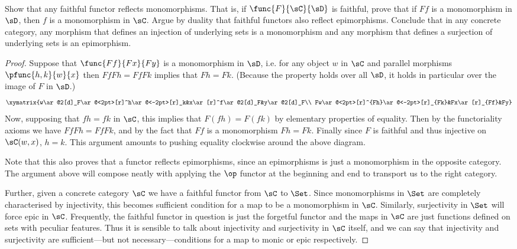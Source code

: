 \documentclass[main.tex]{subfiles}
\begin{document}
\paragraph{}
\begin{exercise}
	Show that any faithful functor reflects monomorphisms. That is, if
	\(\func{F}{\sC}{\sD}\) is faithful, prove that if \(Ff\) is a monomorphism
	in \(\sD\), then \(f\) is a monomorphism in \(\sC\). Argue by duality that
	faithful functors also reflect epimorphisms. Conclude that in any concrete
	category, any morphism that defines an injection of underlying sets is a
	monomorphism and any morphism that defines a surjection of underlying sets
	is an epimorphism.
\end{exercise}
\begin{proof}
	Suppose that \(\func{Ff}{Fx}{Fy}\) is a monomorphism in \(\sD\), i.e. for
	any object \(w\) in \(\sC\) and parallel morphisms \(\pfunc{h,k}{w}{x}\)
	then \(FfFh=FfFk\) implies that \(Fh=Fk\). (Because the property holds over
	all \(\sD\), it holds in particular over the image of \(F\) in \(\sD\).)
	\[
		\xymatrix{w\ar@2[d]_F\ar@<2pt>[r]^h\ar@<-2pt>[r]_k&x\ar[r]^f\ar@2[d]_F&y\ar@2[d]_F\\
		Fw\ar@<2pt>[r]^{Fh}\ar@<-2pt>[r]_{Fk}&Fx\ar[r]_{Ff}&Fy}
	\]
	Now, supposing that \(fh=fk\) in \(\sC\), this implies that \(F(fh)=F(fk)\)
	by elementary properties of equality. Then by the functoriality axioms we
	have \(FfFh=FfFk\), and by the fact that \(Ff\) is a monomorphism \(Fh=Fk\).
	Finally since \(F\) is faithful and thus injective on \(\sC(w,x)\), \(h=k\).
	This argument amounts to pushing equality clockwise around the above
	diagram.

	Note that this also proves that a functor reflects epimorphisms, since an
	epimorphisms is just a monomorphism in the opposite category. The argument
	above will compose neatly with applying the \(\op\) functor at the beginning
	and end to transport us to the right category.

	Further, given a concrete category \(\sC\) we have a faithful functor from
	\(\sC\) to \(\Set\). Since monomorphisms in \(\Set\) are completely
	characterised by injectivity, this becomes sufficient condition for a map to
	be a monomorphism in \(\sC\). Similarly, surjectivity in \(\Set\) will force
	epic in \(\sC\). Frequently, the faithful functor in question is just the
	forgetful functor and the maps in \(\sC\) are just functions defined on sets
	with peculiar features. Thus it is sensible to talk about injectivity and
	surjectivity in \(\sC\) itself, and we can say that injectivity and
	surjectivity are sufficient---but not necessary---conditions for a map to
	monic or epic respectively.
\end{proof}
\end{document}
